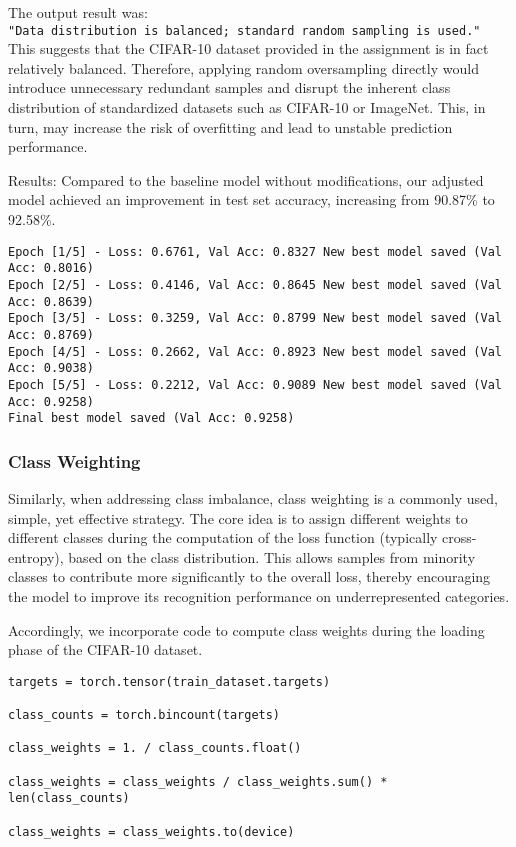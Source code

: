 The output result was:
\texttt{"Data\ distribution\ is\ balanced;\ standard\ random\ sampling\ is\ used."}
This suggests that the CIFAR-10 dataset provided in the assignment is in
fact relatively balanced. Therefore, applying random oversampling
directly would introduce unnecessary redundant samples and disrupt the
inherent class distribution of standardized datasets such as CIFAR-10 or
ImageNet. This, in turn, may increase the risk of overfitting and lead
to unstable prediction performance.

Results: Compared to the baseline model without modifications, our
adjusted model achieved an improvement in test set accuracy, increasing
from 90.87\% to 92.58\%.

\begin{verbatim}
Epoch [1/5] - Loss: 0.6761, Val Acc: 0.8327 New best model saved (Val Acc: 0.8016)
Epoch [2/5] - Loss: 0.4146, Val Acc: 0.8645 New best model saved (Val Acc: 0.8639)
Epoch [3/5] - Loss: 0.3259, Val Acc: 0.8799 New best model saved (Val Acc: 0.8769)
Epoch [4/5] - Loss: 0.2662, Val Acc: 0.8923 New best model saved (Val Acc: 0.9038)
Epoch [5/5] - Loss: 0.2212, Val Acc: 0.9089 New best model saved (Val Acc: 0.9258)
Final best model saved (Val Acc: 0.9258)
\end{verbatim}

\subsubsection{Class Weighting}\label{class-weighting}

Similarly, when addressing class imbalance, class weighting is a
commonly used, simple, yet effective strategy. The core idea is to
assign different weights to different classes during the computation of
the loss function (typically cross-entropy), based on the class
distribution. This allows samples from minority classes to contribute
more significantly to the overall loss, thereby encouraging the model to
improve its recognition performance on underrepresented categories.

Accordingly, we incorporate code to compute class weights during the
loading phase of the CIFAR-10 dataset.

\begin{verbatim}
targets = torch.tensor(train_dataset.targets)

class_counts = torch.bincount(targets)

class_weights = 1. / class_counts.float()  

class_weights = class_weights / class_weights.sum() * len(class_counts)

class_weights = class_weights.to(device)
\end{verbatim}

